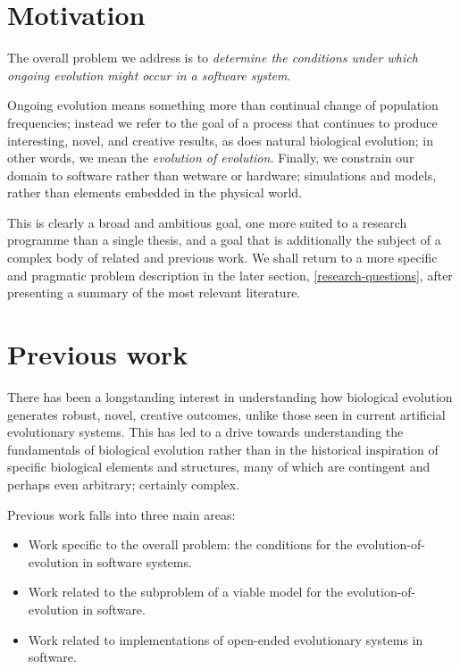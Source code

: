 \section{Motivation}
The overall problem we address is to \textit{determine the conditions under which ongoing evolution might occur in a software system}. 

Ongoing evolution means something more than continual change of population frequencies; instead we refer to the goal of a process that continues to produce interesting, novel, and creative results, as does natural biological evolution; in other words, we mean the \textit{evolution of evolution.} Finally, we constrain our domain to software rather than wetware or hardware; simulations and models, rather than elements embedded in the physical world.

This is clearly a broad and ambitious goal, one more suited to a research programme than a single thesis, and a goal that is additionally the subject of a complex body of related and previous work. We shall return to a more specific and pragmatic problem description in the later section, \ref{research-questions}, after presenting a summary of the most relevant literature.
	
\section{Previous work}

There has been a longstanding interest in understanding how biological evolution generates robust, novel, creative outcomes, unlike those seen in current artificial evolutionary systems. This has led to a drive towards understanding the fundamentals of biological evolution rather than in the historical inspiration of specific biological elements and structures, many of which are contingent and perhaps even arbitrary; certainly complex.

Previous work falls into three main areas:

\begin{itemize}
\item Work specific to the overall problem: the conditions for the evolution-of-evolution in software systems.
\item Work related to the subproblem of a viable model for the evolution-of-evolution in software.
\item Work related to implementations of open-ended evolutionary systems in software.
\end{itemize}
	
